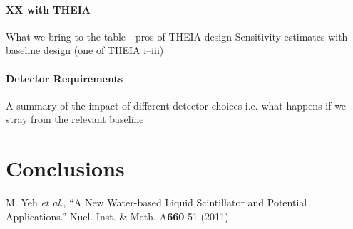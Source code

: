 \documentclass[11pt,prd,letterpaper,amsmath,amssymb,final,nofootinbib
,unsortedaddress,superscriptaddress
]{revtex4-1}
\begin{document}
\paragraph{XX with THEIA}
What we bring to the table - pros of THEIA design \newline
Sensitivity estimates with baseline design (one of THEIA i--iii)
\paragraph{Detector Requirements}
A summary of the impact of different detector choices i.e. what happens if we stray from the relevant baseline




%
%
%
%
%
%


\section{Conclusions}

\begin{thebibliography}{00}

M. Yeh {\it et al.}, { ``A New Water-based Liquid Scintillator and Potential Applications.''} 
Nucl. Inst. \& Meth. A{\bf 660} 51 (2011).

\end{thebibliography}
\end{document}
